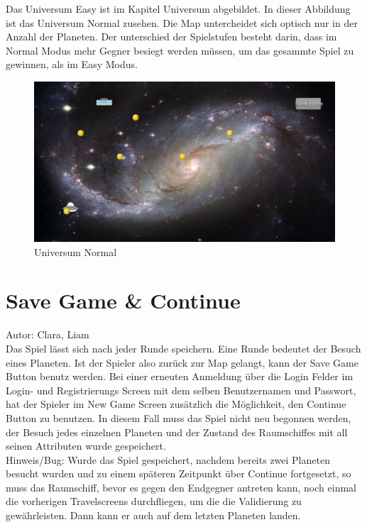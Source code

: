 \documentclass[fontsize=12pt,paper=a4,twoside]{scrartcl}
\begin{document}
Das Universum Easy ist im Kapitel Universum abgebildet. In dieser Abbildung ist das Universum Normal zusehen. Die Map untercheidet sich optisch nur in der Anzahl der Planeten.
Der unterschied der Spielstufen besteht darin, dass im Normal Modus mehr Gegner besiegt werden müssen, 
um das gesammte Spiel zu gewinnen, als im Easy Modus.

\begin{figure}[htp]
	\centering
	\includegraphics[width=1.00\linewidth]{pics/universumNormal.png}
	\caption{Universum Normal}
	\label{fig1}
\end{figure}
\newpage


\section{Save Game \& Continue}
Autor: Clara, Liam\\

Das Spiel lässt sich nach jeder Runde speichern. Eine Runde bedeutet der Besuch eines Planeten.
Ist der Spieler also zurück zur Map gelangt, kann der Save Game Button benutz werden.
Bei einer erneuten Anmeldung über die Login Felder im Login- und Registrierungs Screen mit dem selben
Benutzernamen und Passwort, hat der Spieler im New Game Screen zusätzlich die Möglichkeit, den Continue
Button zu benutzen. In diesem Fall muss das Spiel nicht neu begonnen werden, der Besuch jedes einzelnen Planeten und der Zustand des Raumschiffes mit all seinen Attributen wurde gespeichert.\\

Hinweis/Bug: Wurde das Spiel gespeichert, nachdem bereits zwei Planeten besucht wurden und zu einem späteren Zeitpunkt über Continue fortgesetzt, so muss das Raumschiff, bevor es gegen den Endgegner antreten kann, noch einmal die vorherigen Travelscreens durchfliegen, um die die Validierung zu gewährleisten. Dann kann er auch auf dem letzten Planeten landen.
\end{document}

